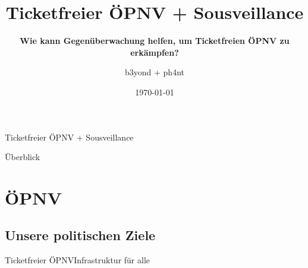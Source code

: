 \documentclass[10pt]{beamer}
\title[] %
{ %
      \textbf{Ticketfreier \"OPNV + Sousveillance}
}
\subtitle[Ticketfreier \"OPNV + Sousveillance]
{
      \textbf{Wie kann Gegenüberwachung helfen, um Ticketfreien ÖPNV zu erkämpfen?}
}
\author[b3yond + ph4nt]
{      b3yond + ph4nt \\
      {}
}
\institute[]
{
      Netzwerk für kybernetischen Anarchismus + Sousveillance
  
}
\date{\today}
\begin{document}

{\1%



\begin{frame}{Ticketfreier \"OPNV + Sousveillance}{}

\maketitle
\tableofcontents

\end{frame}

\begin{frame}{Überblick}{}

\tableofcontents

\end{frame}

\section{ÖPNV}
\subsection{Unsere politischen Ziele}
\begin{frame}{Ticketfreier ÖPNV}{Infrastruktur für alle}


\end{frame}}
\end{document}
